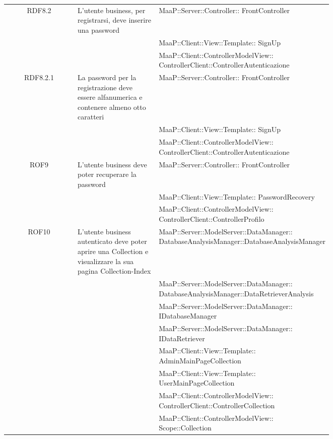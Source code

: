\begin{center}
\begin{longtable}{|c|p{0.25\linewidth}|p{0.5\linewidth}|}
\midrule
RDF8.2
& L'utente business, per registrarsi, deve inserire una password
& MaaP::Server::Controller:: FrontController\\
& & MaaP::Client::View::Template:: SignUp\\
& & MaaP::Client::ControllerModelView:: ControllerClient::ControllerAutenticazione\\

\midrule
RDF8.2.1
& La password per la registrazione deve essere alfanumerica e contenere almeno otto caratteri
& MaaP::Server::Controller:: FrontController\\
& & MaaP::Client::View::Template:: SignUp\\
& & MaaP::Client::ControllerModelView:: ControllerClient::ControllerAutenticazione\\

\midrule
ROF9
& L'utente business deve poter recuperare la password
& MaaP::Server::Controller:: FrontController\\
& & MaaP::Client::View::Template:: PasswordRecovery\\
& & MaaP::Client::ControllerModelView:: ControllerClient::ControllerProfilo\\

\midrule
ROF10
& L'utente business autenticato deve poter aprire una Collection e visualizzare la sua pagina Collection-Index
& MaaP::Server::ModelServer::DataManager:: DatabaseAnalysisManager::DatabaseAnalysisManager\\
& & MaaP::Server::ModelServer::DataManager:: DatabaseAnalysisManager::DataRetrieverAnalysis\\
& & MaaP::Server::ModelServer::DataManager:: IDatabaseManager\\
& & MaaP::Server::ModelServer::DataManager:: IDataRetriever\\
& & MaaP::Client::View::Template:: AdminMainPageCollection\\
& & MaaP::Client::View::Template:: UserMainPageCollection\\
& & MaaP::Client::ControllerModelView:: ControllerClient::ControllerCollection\\
& & MaaP::Client::ControllerModelView:: Scope::Collection\\


\end{longtable}
\end{center}
